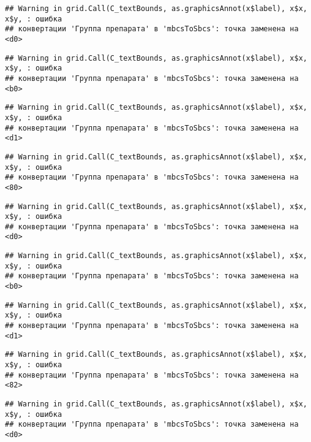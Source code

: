\documentclass[
]{article}
\begin{document}
\begin{verbatim}
## Warning in grid.Call(C_textBounds, as.graphicsAnnot(x$label), x$x, x$y, : ошибка
## конвертации 'Группа препарата' в 'mbcsToSbcs': точка заменена на <d0>
\end{verbatim}

\begin{verbatim}
## Warning in grid.Call(C_textBounds, as.graphicsAnnot(x$label), x$x, x$y, : ошибка
## конвертации 'Группа препарата' в 'mbcsToSbcs': точка заменена на <b0>
\end{verbatim}

\begin{verbatim}
## Warning in grid.Call(C_textBounds, as.graphicsAnnot(x$label), x$x, x$y, : ошибка
## конвертации 'Группа препарата' в 'mbcsToSbcs': точка заменена на <d1>
\end{verbatim}

\begin{verbatim}
## Warning in grid.Call(C_textBounds, as.graphicsAnnot(x$label), x$x, x$y, : ошибка
## конвертации 'Группа препарата' в 'mbcsToSbcs': точка заменена на <80>
\end{verbatim}

\begin{verbatim}
## Warning in grid.Call(C_textBounds, as.graphicsAnnot(x$label), x$x, x$y, : ошибка
## конвертации 'Группа препарата' в 'mbcsToSbcs': точка заменена на <d0>
\end{verbatim}

\begin{verbatim}
## Warning in grid.Call(C_textBounds, as.graphicsAnnot(x$label), x$x, x$y, : ошибка
## конвертации 'Группа препарата' в 'mbcsToSbcs': точка заменена на <b0>
\end{verbatim}

\begin{verbatim}
## Warning in grid.Call(C_textBounds, as.graphicsAnnot(x$label), x$x, x$y, : ошибка
## конвертации 'Группа препарата' в 'mbcsToSbcs': точка заменена на <d1>
\end{verbatim}

\begin{verbatim}
## Warning in grid.Call(C_textBounds, as.graphicsAnnot(x$label), x$x, x$y, : ошибка
## конвертации 'Группа препарата' в 'mbcsToSbcs': точка заменена на <82>
\end{verbatim}

\begin{verbatim}
## Warning in grid.Call(C_textBounds, as.graphicsAnnot(x$label), x$x, x$y, : ошибка
## конвертации 'Группа препарата' в 'mbcsToSbcs': точка заменена на <d0>
\end{verbatim}
\end{document}
